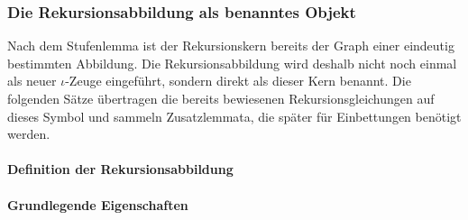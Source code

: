 \documentclass[main.tex]{subfiles}
\begin{document}
\begin{tabproof}



\end{tabproof}

\subsubsection{Die Rekursionsabbildung als benanntes Objekt}

Nach dem Stufenlemma ist der Rekursionskern bereits der Graph einer eindeutig
bestimmten Abbildung. Die Rekursionsabbildung wird deshalb nicht noch einmal
als neuer \(\iota\)-Zeuge eingeführt, sondern direkt als dieser Kern benannt.
Die folgenden Sätze übertragen die bereits bewiesenen Rekursionsgleichungen
auf dieses Symbol und sammeln Zusatzlemmata, die später für Einbettungen
benötigt werden.

\paragraph{Definition der Rekursionsabbildung}


\paragraph{Grundlegende Eigenschaften}
\end{document}
